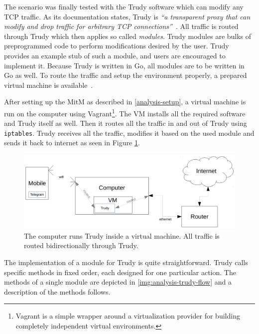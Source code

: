 \documentclass[thesis=M,english]{FITthesis}[2012/10/20]
\begin{document}
The scenario was finally tested with the Trudy software which can modify any TCP traffic. As its documentation states, Trudy is \emph{``a transparent proxy that can modify and drop traffic for arbitrary TCP connections''}~\cite{github-trudy}. All traffic is routed through Trudy which then applies so called \emph{modules}. Trudy modules are bulks of preprogrammed code to perform modifications desired by the user. Trudy provides an example stub of such a module, and users are encouraged to implement it. Because Trudy is written in Go, all modules are to be written in Go as well. To route the traffic and setup the environment properly, a prepared virtual machine is available~\cite{github-trudy-vm}.

After setting up the MitM as described in \ref{analysis-setup}, a virtual machine is run on the computer using Vagrant\footnote{Vagrant is a simple wrapper around a virtualization provider for building completely independent virtual environments.}. The VM installs all the required software and Trudy itself as well. Then it routes all the traffic in and out of Trudy using \texttt{iptables}. Trudy receives all the traffic, modifies it based on the used module and sends it back to internet as seen in Figure \ref{img:analysis-trudy-setup}.

\begin{figure}[htb]
	\centering
	\includegraphics[width=1\textwidth]{setup-trudy.pdf}
	\caption[Trudy setup]{The computer runs Trudy inside a virtual machine. All traffic is routed bidirectionally through Trudy.}
	\label{img:analysis-trudy-setup}
\end{figure}


The implementation of a module for Trudy is quite straightforward. Trudy calls specific methods in fixed order, each designed for one particular action. The methods of a single module are depicted in \ref{img:analysis-trudy-flow} and a description of the methods follows.
\end{document}
